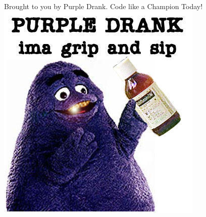 \documentclass[]{sigplanconf}
\begin{document}
\acks
Brought to you by Purple Drank\texttrademark. Code like a Champion Today!
\includegraphics[width=\columnwidth]{texobjs/drank.jpg}




\end{document}
